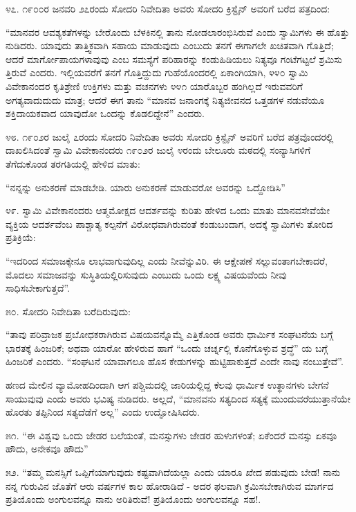 ೪೭. ೧೯೦೦ರ ಜನವರಿ ೨೭ರಂದು ಸೋದರಿ ನಿವೇದಿತಾ ಅವರು ಸೋದರಿ ಕ್ರಿಸ್ಟೈನ್ ಅವರಿಗೆ ಬರೆದ ಪತ್ರದಿಂದ:

“ಮಾನವರ ಆವಶ್ಯಕತೆಗಳನ್ನು ಬೇರೊಂದು ಬೆಳಕಿನಲ್ಲಿ ತಾನು ನೋಡಲಾರಂಭಿಸಿರುವೆ ಎಂದು ಸ್ವಾಮಿಗಳು ಈ ಹೊತ್ತು ನುಡಿದರು. ಯಾವುದು ತಾತ್ತ್ವಿಕವಾಗಿ ಸಹಾಯ ಮಾಡುವುದು ಎಂಬುದು ತನಗೆ ಈಗಾಗಲೇ ಖಚಿತವಾಗಿ ಗೊತ್ತಿದೆ; ಆದರೆ ಮಾರ್ಗೋಪಾಯಗಳಾವುವು ಎಂಬ ಸಮಸ್ಯೆಗೆ ಪರಿಹಾರನ್ನು ಕಂಡುಹಿಡಿಯಲು ನಿತ್ಯವೂ ಗಂಟೆಗಟ್ಟಲೆ ಶ್ರಮಿಸು ತ್ತಿರುವೆ ಎಂದರು. ಇಲ್ಲಿಯವರೆಗೆ ತನಗೆ ಗೊತ್ತಿದ್ದುದು ಗುಹೆಯೊಂದರಲ್ಲಿ ಏಕಾಂಗಿಯಾಗಿ, ೪೪೦ ಸ್ವಾಮಿ ವಿವೇಕಾನಂದರ ಕೃತಿಶ್ರೇಣಿ ಉಕ್ತಿಗಳು ಮತ್ತು ವಚನಗಳು ೪೪೧ ಯಾರೊಬ್ಬರ ಹಂಗಿಲ್ಲದೆ ಇರುವವರಿಗೆ ಅಗತ್ಯವಾದುದುದು ಮಾತ್ರ; ಆದರೆ ಈಗ ತಾನು “ಮಾನವ ಜನಾಂಗಕ್ಕೆ ನಿತ್ಯಜೀವನದ ಒತ್ತಡಗಳ ನಡುವೆಯೂ ಶಕ್ತಿದಾಯಕವಾದ ಯಾವುದೋ ಒಂದನ್ನು ಕೊಡಲಿದ್ದೇನೆ” ಎಂದರು. 

೪೮. ೧೯೦೨ರ ಜುಲೈ ೭ರಂದು ಸೋದರಿ ನಿವೇದಿತಾ ಅವರು ಸೋದರಿ ಕ್ರಿಸ್ಟೈನ್ ಅವರಿಗೆ ಬರೆದ ಪತ್ರವೊಂದರಲ್ಲಿ ದಾಖಲಿಸಿದಂತೆ ಸ್ವಾಮಿ ವಿವೇಕಾನಂದರು ೧೯೦೨ರ ಜುಲೈ ೪ರಂದು ಬೇಲೂರು ಮಠದಲ್ಲಿ ಸಂನ್ಯಾಸಿಗಳಿಗೆ ತೆಗೆದುಕೊಂಡ ತರಗತಿಯಲ್ಲಿ ಹೇಳಿದ ಮಾತು:

“ನನ್ನನ್ನು ಅನುಕರಣೆ ಮಾಡಬೇಡಿ. ಯಾರು ಅನುಕರಣೆ ಮಾಡುವರೋ ಅವರನ್ನು ಒದ್ದೋಡಿಸಿ” 

೪೯. ಸ್ವಾಮಿ ವಿವೇಕಾನಂದರು ಆತ್ಮಮೋಕ್ಷದ ಆದರ್ಶವನ್ನು ಕುರಿತು ಹೇಳಿದ ಒಂದು ಮಾತು ಮಾನವಸೇವೆಯೇ ವ್ಯಕ್ತಿಯ ಆದರ್ಶವೆಂಬ ಪಾಶ್ಚಾತ್ಯ ಕಲ್ಪನೆಗೆ ವಿರೋಧವಾಗಿರುವಂತೆ ಕಂಡುಬಂದಾಗ, ಅದಕ್ಕೆ ಸ್ವಾಮಿಗಳು ತೋರಿದ ಪ್ರತಿಕ್ರಿಯೆ:

“ಇದರಿಂದ ಸಮಾಜಕ್ಕೇನೂ ಲಾಭವಾಗುವುದಿಲ್ಲ ಎಂದು ನೀವೆನ್ನುವಿರಿ. ಈ ಆಕ್ಷೇಪಣೆ ಸಲ್ಲುವಂತಾಗಬೇಕಾದರೆ, ಮೊದಲು ಸಮಾಜವನ್ನು ಸುಸ್ಥಿತಿಯಲ್ಲಿರಿಸುವುದು ಎಂಬುದು ಒಂದು ಲಕ್ಷ್ಯ ವಿಷಯವೆಂದು ನೀವು ಸಾಧಿಸಬೇಕಾಗುತ್ತದೆ”. 

೫೦. ಸೋದರಿ ನಿವೇದಿತಾ ಬರೆದಿರುವುದು:

“ತಾವು ಪರಿವ್ರಾಜಕ ಪ್ರಬೋಧಕರಾಗಿರುವ ವಿಷಯವನ್ನೊಮ್ಮೆ ಎತ್ತಿಕೊಂಡ ಅವರು ಧಾರ್ಮಿಕ ಸಂಘಟನೆಯ ಬಗ್ಗೆ ಭಾರತಕ್ಕೆ ಹಿಂಜರಿಕೆ; ಅಥವಾ ಯಾರೋ ಹೇಳಿರುವ ಹಾಗೆ “ಒಂದು ಚರ್ಚ್ನಲ್ಲಿ ಕೊನೆಗೊಳ್ಳುವ ಶ್ರದ್ಧೆ” ಯ ಬಗ್ಗೆ ಹಿಂಜರಿಕೆ ಎಂದರು. “ಸಂಘಟನೆ ಯಾವಾಗಲೂ ಹೊಸ ಕೇಡುಗಳನ್ನು ಹುಟ್ಟಿಹಾಕುತ್ತದೆ ಎಂದೇ ನಾವು ನಂಬುತ್ತೇವೆ”.

ಹಣದ ಮೇಲಿನ ವ್ಯಾಮೋಹದಿಂದಾಗಿ ಆಗ ಪಶ್ಚಿಮದಲ್ಲಿ ಜಾರಿಯಲ್ಲಿದ್ದ ಕೆಲವು ಧಾರ್ಮಿಕ ಉತ್ಥಾನಗಳು ಬೇಗನೆ ಸಾಯುವುವು ಎಂದು ಅವರು ಭವಿಷ್ಯ ನುಡಿದರು. ಅಲ್ಲದೆ, “ಮಾನವನು ಸತ್ಯದಿಂದ ಸತ್ಯಕ್ಕೆ ಮುಂದುವರೆಯುತ್ತಾನೆಯೇ ಹೊರತು ತಪ್ಪಿನಿಂದ ಸತ್ಯದೆಡೆಗೆ ಅಲ್ಲ” ಎಂದು ಉದ್ಘೋಷಿಸಿದರು. 

೫೧. “ಈ ವಿಶ್ವವು ಒಂದು ಜೇಡರ ಬಲೆಯಂತೆ, ಮನಸ್ಸುಗಳು ಜೇಡರ ಹುಳುಗಳಂತೆ; ಏಕೆಂದರೆ ಮನಸ್ಸು ಏಕವೂ ಹೌದು, ಅನೇಕವೂ ಹೌದು” 

೫೨. “ತಮ್ಮ ಮನಸ್ಸಿಗೆ ಒಪ್ಪಿಗೆಯಾಗುವುದು ಕಷ್ಟವಾಗಿದೆಯಲ್ಲಾ ಎಂದು ಯಾರೂ ಖೇದ ಪಡುವುದು ಬೇಡ! ನಾನು ನನ್ನ ಗುರುವಿನ ಜೊತೆಗೆ ಆರು ವರ್ಷಗಳ ಕಾಲ ಹೋರಾಡಿದೆ - ಅದರ ಫಲವಾಗಿ ಕ್ರಮಿಸಬೇಕಾಗಿರುವ ಮಾರ್ಗದ ಪ್ರತಿಯೊಂದು ಅಂಗುಲವನ್ನೂ ನಾನು ಅರಿತಿರುವೆ! ಪ್ರತಿಯೊಂದು ಅಂಗುಲವನ್ನೂ ಸಹ!. 

